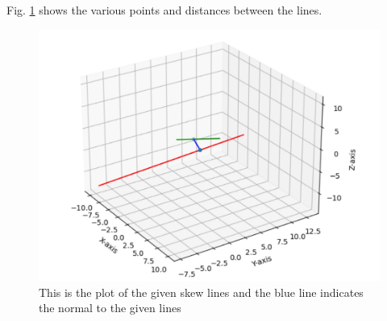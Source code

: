 \begin{enumerate}[label=\thesubsection.\arabic*.,ref=\thesubsection.\theenumi]
%
Fig.     \ref{fig:pseudo_Skew_lines} shows the various points and distances between the lines.
\begin{figure}[!ht]
\centering
    \includegraphics[width=\columnwidth]{./figs/pseudo/assignment2.jpg}
    \caption{This is the plot of the given skew lines and the blue line indicates the normal to the given lines}
    \label{fig:pseudo_Skew_lines}
\end{figure}


\end{enumerate}
